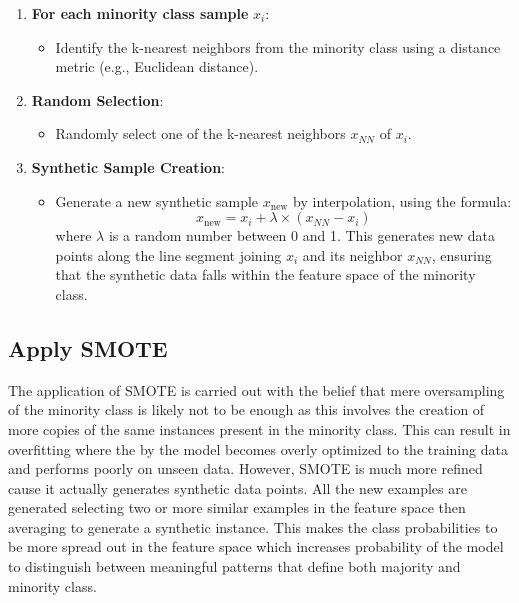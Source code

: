 \documentclass[12pt, a4paper,oneside]{book}
\numberwithin{equation}{section}
\begin{document}
\begin{enumerate}
    \item \textbf{For each minority class sample} \(x_i\):
    \begin{itemize}
        \item Identify the k-nearest neighbors from the minority class using a distance metric (e.g., Euclidean distance).
    \end{itemize}
    
    \item \textbf{Random Selection}:
    \begin{itemize}
        \item Randomly select one of the k-nearest neighbors \(x_{NN}\) of \(x_i\).
    \end{itemize}

    \item \textbf{Synthetic Sample Creation}:
    \begin{itemize}
        \item Generate a new synthetic sample \(x_{\text{new}}\) by interpolation, using the formula:
        \[
        x_{\text{new}} = x_i + \lambda \times (x_{NN} - x_i)
        \]
        where \(\lambda\) is a random number between 0 and 1. This generates new data points along the line segment joining \(x_i\) and its neighbor \(x_{NN}\), ensuring that the synthetic data falls within the feature space of the minority class.\cite{9}
    \end{itemize}
\end{enumerate}


\subsection{Apply SMOTE}

The application of SMOTE is carried out with the belief that mere oversampling of the minority class is likely not to be enough as this involves the creation of more copies of the same instances present in the minority class. This can result in overfitting where the by the model becomes overly optimized to the training data and performs poorly on unseen data. However, SMOTE is much more refined cause it actually generates synthetic data points. All the new examples are generated selecting two or more similar examples in the feature space then averaging to generate a synthetic instance. This makes the class probabilities to be more spread out in the feature space which increases probability of the model to distinguish between meaningful patterns that define both majority and minority class. 
\end{document}
